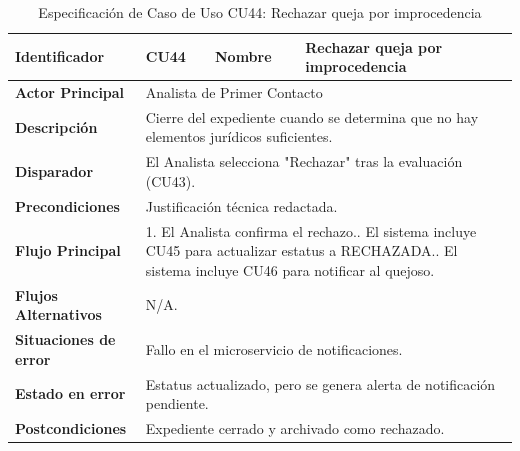\begingroup
\setlength{\parskip}{0pt}
\begin{longtable}{|p{3.5cm}|p{2cm}|p{2.5cm}|p{7cm}|}
\caption{Especificación de Caso de Uso CU44: Rechazar queja por improcedencia}
\label{tab:cu44} \\
\hline
\textbf{Identificador} & CU44 & \textbf{Nombre} & Rechazar queja por improcedencia \\ \hline
\textbf{Actor Principal} & \multicolumn{3}{p{11.5cm}|}{Analista de Primer Contacto} \\ \hline
\textbf{Descripción} & \multicolumn{3}{p{11.5cm}|}{Cierre del expediente cuando se determina que no hay elementos jurídicos suficientes.} \\ \hline
\textbf{Disparador} & \multicolumn{3}{p{11.5cm}|}{El Analista selecciona "Rechazar" tras la evaluación (CU43).} \\ \hline
\textbf{Precondiciones} & \multicolumn{3}{p{11.5cm}|}{Justificación técnica redactada.} \\ \hline
\textbf{Flujo Principal} & \multicolumn{3}{p{11.5cm}|}{1. El Analista confirma el rechazo.\newline 2. El sistema incluye CU45 para actualizar estatus a RECHAZADA.\newline 3. El sistema incluye CU46 para notificar al quejoso.} \\ \hline
\textbf{Flujos Alternativos} & \multicolumn{3}{p{11.5cm}|}{N/A.} \\ \hline
\textbf{Situaciones de error} & \multicolumn{3}{p{11.5cm}|}{Fallo en el microservicio de notificaciones.} \\ \hline
\textbf{Estado en error} & \multicolumn{3}{p{11.5cm}|}{Estatus actualizado, pero se genera alerta de notificación pendiente.} \\ \hline
\textbf{Postcondiciones} & \multicolumn{3}{p{11.5cm}|}{Expediente cerrado y archivado como rechazado.} \\ \hline
\end{longtable}
\endgroup

\vspace{0.8cm}

